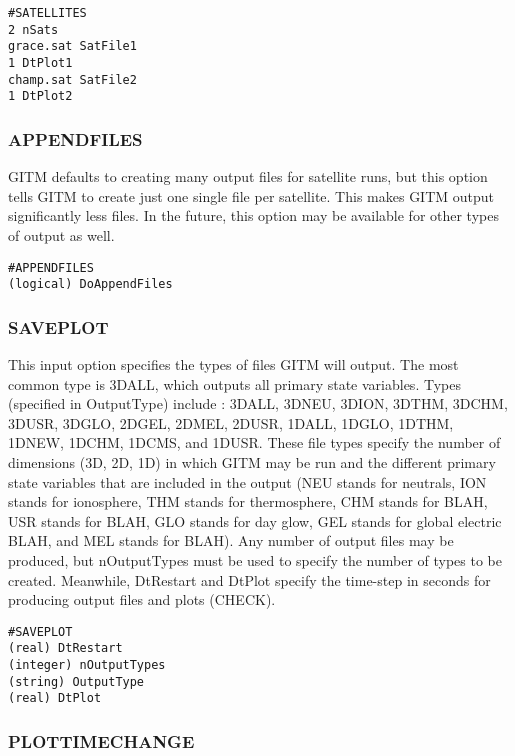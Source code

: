 \begin{verbatim}
#SATELLITES
2 nSats
grace.sat SatFile1
1 DtPlot1
champ.sat SatFile2
1 DtPlot2
\end{verbatim}

\subsubsection{APPENDFILES}
\label{appendfiles.sec}

GITM defaults to creating many output files for satellite runs, but this option tells GITM to create just one single file per satellite.  This makes GITM output significantly less files.  In the future, this option may be available for other types of output as well.

\begin{verbatim}
#APPENDFILES
(logical) DoAppendFiles
\end{verbatim}

\subsubsection{SAVEPLOT}
\label{saveplot.sec}

This input option specifies the types of files GITM will output.  The most common type is 3DALL, which outputs all primary state variables. Types (specified in OutputType) include : 3DALL, 3DNEU, 3DION, 3DTHM, 3DCHM, 3DUSR, 3DGLO, 2DGEL, 2DMEL, 2DUSR, 1DALL, 1DGLO, 1DTHM, 1DNEW, 1DCHM, 1DCMS, and 1DUSR.  These file types specify the number of dimensions (3D, 2D, 1D) in which GITM may be run and the different primary state variables that are included in the output (NEU stands for neutrals, ION stands for ionosphere, THM stands for thermosphere, CHM stands for BLAH, USR stands for BLAH, GLO stands for day glow, GEL stands for global electric BLAH, and MEL stands for BLAH).  Any number of output files may be produced, but nOutputTypes must be used to specify the number of types to be created.  Meanwhile, DtRestart and DtPlot specify the time-step in seconds for producing output files and plots (CHECK).

\begin{verbatim}
#SAVEPLOT
(real) DtRestart
(integer) nOutputTypes 
(string) OutputType
(real) DtPlot   
\end{verbatim}

\subsubsection{PLOTTIMECHANGE}
\label{plottimechange.sec}

